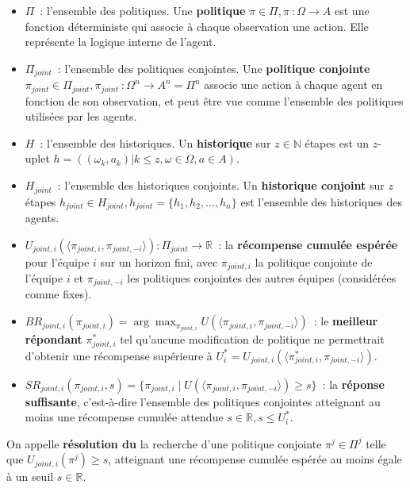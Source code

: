 \begin{itemize}
    \item $\Pi$~: l'ensemble des politiques. Une \textbf{politique} $\pi \in \Pi, \pi~: \Omega \rightarrow A$ est une fonction déterministe qui associe à chaque observation une action. Elle représente la logique interne de l'agent.
    \item $\Pi_{joint}$~: l'ensemble des politiques conjointes. Une \textbf{politique conjointe} $\pi_{joint} \in \Pi_{joint}, \pi_{joint}~: \Omega^n \rightarrow A^n = \Pi^n$ associe une action à chaque agent en fonction de son observation, et peut être vue comme l'ensemble des politiques utilisées par les agents.
    \item $H$~: l'ensemble des historiques. Un \textbf{historique} sur $z \in \mathbb{N}$ étapes est un $z$-uplet $h = ((\omega_k, a_k) | k \leq z, \omega \in \Omega, a \in A)$.
    \item $H_{joint}$~: l'ensemble des historiques conjoints. Un \textbf{historique conjoint} sur $z$ étapes $h_{joint} \in H_{joint}, h_{joint} = \{h_1, h_2, ..., h_n\}$ est l'ensemble des historiques des agents.
    \item $U_{joint,i}(\langle \pi_{joint,i}, \pi_{joint,-i} \rangle): \Pi_{joint} \rightarrow \mathbb{R}$~: la \textbf{récompense cumulée espérée} pour l'équipe $i$ sur un horizon fini, avec $\pi_{joint,i}$ la politique conjointe de l'équipe $i$ et $\pi_{joint,-i}$ les politiques conjointes des autres équipes (considérées comme fixes).
    \item $BR_{joint,i}(\pi_{joint,i}) = \arg\max_{\pi_{joint,i}} U(\langle \pi_{joint,i}, \pi_{joint,-i} \rangle)$~: le \textbf{meilleur répondant} $\pi^*_{joint,i}$ tel qu'aucune modification de politique ne permettrait d'obtenir une récompense supérieure à $U^*_i = U_{joint,i}(\langle \pi^*_{joint,i}, \pi_{joint,-i} \rangle)$.
    \item $SR_{joint,i}(\pi_{joint,i}, s) = \{\pi_{joint,i} \mid U(\langle \pi_{joint,i}, \pi_{joint,-i} \rangle) \geq s\}$~: la \textbf{réponse suffisante}, c'est-à-dire l'ensemble des politiques conjointes atteignant au moins une récompense cumulée attendue $s \in \mathbb{R}, s \leq U^*_i$.
\end{itemize}

On appelle \textbf{résolution du } la recherche d'une politique conjointe $\pi^j \in \Pi^j$ telle que $U_{joint,i}(\pi^j) \geq s$, atteignant une récompense cumulée espérée au moins égale à un seuil $s \in \mathbb{R}$.



